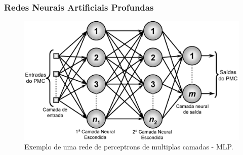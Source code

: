 \documentclass{beamer}
\begin{document}
\begin{frame}
    \frametitle{Redes Neurais Artificiais Profundas}

    \begin{figure}[!ht]
        \centering
        \includegraphics[width=0.6\columnwidth]{
            Imagens/RedeNeural.PNG
        }
        \caption{Exemplo de uma rede de perceptrons de multiplas camadas - MLP.}
        \label{fig:ann}
    \end{figure}

\end{frame}
\end{document}
